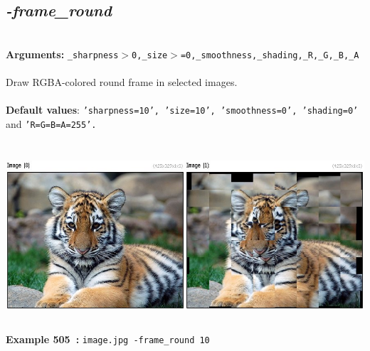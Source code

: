 \documentclass[a4paper,11pt,twoside]{book}
\begin{document}
\subsection{\emph{-frame\_round} }\vspace*{-0.5em}
~\\\textbf{Arguments: } 
{\small \texttt{\_sharpness$>$0,\_size$>$=0,\_smoothness,\_shading,\_R,\_G,\_B,\_A}}\\~\\
Draw RGBA-colored round frame in selected images.
~\\~\\\textbf{Default values}: {\small \texttt{'sharpness=10', 'size=10', 'smoothness=0', 'shading=0'} and \texttt{'R=G=B=A=255'.}}
\begin{center}\includegraphics[keepaspectratio=true,height=7cm,width=\textwidth]{img/gmic_def505.jpg}\\
{\footnotesize \textbf{Example 505~:} \texttt{image.jpg -frame\_round 10}}
\end{center}
\end{document}
